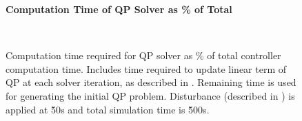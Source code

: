 \ifmakeplots
\begin{figure}
  \centering
  {\large\bfseries Computation Time of QP Solver as \% of Total\\}
  \begin{subfigure}{0.75\linewidth}
  
  \end{subfigure}
  \\
  \begin{subfigure}{0.75\linewidth}
  
  \end{subfigure}
  \caption{Computation time required for QP solver as \% of total controller computation time. Includes time required to update linear term of QP at each solver iteration, as described in . Remaining time is used for generating the initial QP problem. Disturbance (described in ) is applied at \u{50}{s} and total simulation time is \u{500}{s}.}
  \label{fig:res:qp-compcost}
\end{figure}
\fi

